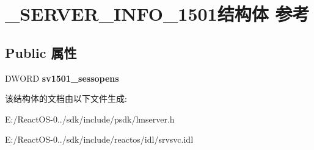 \hypertarget{struct___s_e_r_v_e_r___i_n_f_o__1501}{}\section{\+\_\+\+S\+E\+R\+V\+E\+R\+\_\+\+I\+N\+F\+O\+\_\+1501结构体 参考}
\label{struct___s_e_r_v_e_r___i_n_f_o__1501}
\subsection*{Public 属性}
\begin{DoxyCompactItemize}
\item 
\mbox{\label{struct___s_e_r_v_e_r___i_n_f_o__1501_a7b36d5a78936e581db4dc8c9cfe9a856}} 
D\+W\+O\+RD {\bfseries sv1501\+\_\+sessopens}
\end{DoxyCompactItemize}


该结构体的文档由以下文件生成\+:\begin{DoxyCompactItemize}
\item 
E\+:/\+React\+O\+S-\/0../sdk/include/psdk/lmserver.\+h\item 
E\+:/\+React\+O\+S-\/0../sdk/include/reactos/idl/srvsvc.\+idl\end{DoxyCompactItemize}
